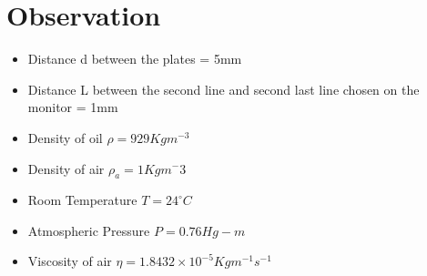\section{Observation}
	\begin{itemize}
		\item Distance d between the plates = 5mm
		\item Distance L between the second line and second last line chosen on the monitor = 1mm
		\item Density of oil $\rho = 929Kgm^{-3}$
		\item Density of air $\rho_a = 1Kgm^-3$
		\item Room Temperature $T = 24^\circ C$
		\item Atmospheric Pressure $P = 0.76Hg-m$
		\item Viscosity of air $\eta = 1.8432\times10^{-5} Kgm^{-1}s^{-1}$
	\end{itemize}
    
    
	
